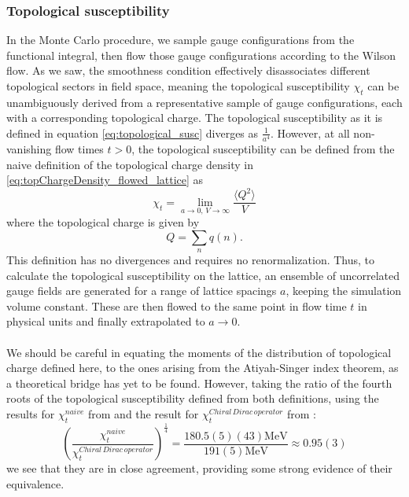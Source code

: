 \documentclass[a4paper,10pt]{article}
\begin{document}
\subsubsection{Topological susceptibility}
In the Monte Carlo procedure, we sample gauge configurations from the functional integral, then flow those gauge configurations according to the Wilson flow. As we saw, the smoothness condition effectively disassociates different topological sectors in field space, meaning the topological susceptibility $\chi_t$ can be unambiguously derived from a representative sample of gauge configurations, each with a corresponding topological charge.
The topological susceptibility as it is defined in equation \eqref{eq:topological_susc} diverges as $\frac{1}{a^4}$. However, at all non-vanishing flow times $t>0$, the topological susceptibility can be defined from the naive definition of the topological charge density in \eqref{eq:topChargeDensity_flowed_lattice} as
\begin{equation}
\chi_t = \lim\limits_{a\rightarrow0,\,V\rightarrow \infty}\frac{\langle Q^2 \rangle}{V}
\end{equation}
where the topological charge is given by
\begin{equation}
Q=\sum_{n} q(n).
\end{equation}
This definition has no divergences and requires no renormalization. Thus, to calculate the topological susceptibility on the lattice, an ensemble of uncorrelated gauge fields are generated for a range of lattice spacings $a$, keeping the simulation volume constant. These are then flowed to the same point in flow time $t$ in physical units and finally extrapolated to $a\rightarrow 0$.\\\\We should be careful in equating the moments of the distribution of topological charge defined here, to the ones arising from the Atiyah-Singer index theorem, as a theoretical bridge has yet to be found. However, taking the ratio of the fourth roots of the topological susceptibility defined from both definitions, using the results for $\chi_t^{naive}$ from \cite{non_gaussianities2015} and the result for $\chi_t^{Chiral\,Dirac \,operator}$ from \cite{PhysRevLett.94.032003}:
\begin{equation}
\left( \frac{\chi_t^{naive}}{\chi_t^{Chiral\,Dirac \,operator}} \right)^{\frac{1}{4}}=\frac{180.5(5)(43) \mathrm{MeV}}{191(5) \mathrm{MeV}} \approx 0.95(3)
\end{equation}
we see that they are in close agreement, providing some strong evidence of their equivalence.
\end{document}
